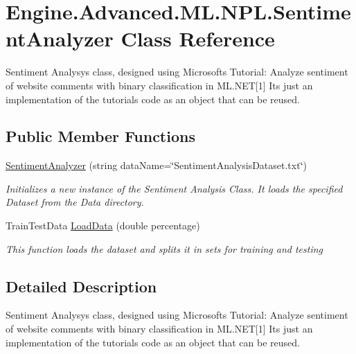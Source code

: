 \hypertarget{class_engine_1_1_advanced_1_1_m_l_1_1_n_p_l_1_1_sentiment_analyzer}{}\section{Engine.\+Advanced.\+M\+L.\+N\+P\+L.\+Sentiment\+Analyzer Class Reference}
\label{class_engine_1_1_advanced_1_1_m_l_1_1_n_p_l_1_1_sentiment_analyzer}


Sentiment Analysys class, designed using Microsoft\textquotesingle{}s Tutorial\+: Analyze sentiment of website comments with binary classification in M\+L.\+N\+ET\mbox{[}1\mbox{]} It\textquotesingle{}s just an implementation of the tutorial\textquotesingle{}s code as an object that can be reused.  


\subsection*{Public Member Functions}
\begin{DoxyCompactItemize}
\item 
\mbox{\hyperlink{class_engine_1_1_advanced_1_1_m_l_1_1_n_p_l_1_1_sentiment_analyzer_a138741ac30d164a8131fac6ed94e35d7}{Sentiment\+Analyzer}} (string data\+Name=\char`\"{}Sentiment\+Analysis\+Dataset.\+txt\char`\"{})
\begin{DoxyCompactList}\small\item\em Initializes a new instance of the Sentiment Analysis Class. It loads the specified Dataset from the Data directory. \end{DoxyCompactList}\item 
Train\+Test\+Data \mbox{\hyperlink{class_engine_1_1_advanced_1_1_m_l_1_1_n_p_l_1_1_sentiment_analyzer_aea5355c7816f5e9a834ed78e5302a67e}{Load\+Data}} (double percentage)
\begin{DoxyCompactList}\small\item\em This function loads the dataset and splits it in sets for training and testing \end{DoxyCompactList}\end{DoxyCompactItemize}


\subsection{Detailed Description}
Sentiment Analysys class, designed using Microsoft\textquotesingle{}s Tutorial\+: Analyze sentiment of website comments with binary classification in M\+L.\+N\+ET\mbox{[}1\mbox{]} It\textquotesingle{}s just an implementation of the tutorial\textquotesingle{}s code as an object that can be reused. 

